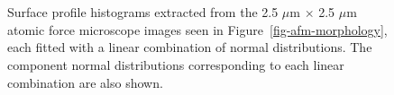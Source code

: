 \documentclass[
  letterpaper,
  DIV=11,
  numbers=noendperiod]{scrartcl}
\begin{document}
\begin{figure}
\begin{minipage}[t]{0.47\linewidth}
{{}

}

\end{minipage}%
\newline
\begin{minipage}[t]{0.26\linewidth}

{\centering 

~

}

\end{minipage}%
%
\begin{minipage}[t]{0.47\linewidth}

{\centering 


}

\end{minipage}%
%
\begin{minipage}[t]{0.26\linewidth}

{\centering 

~

}

\end{minipage}%

\caption{\label{fig-afm-histograms}Surface profile histograms extracted
from the 2.5 \(\mu\)m \(\times\) 2.5 \(\mu\)m atomic force microscope
images seen in Figure~\ref{fig-afm-morphology}, each fitted with a
linear combination of normal distributions. The component normal
distributions corresponding to each linear combination are also shown.}

\end{figure}
\end{document}
